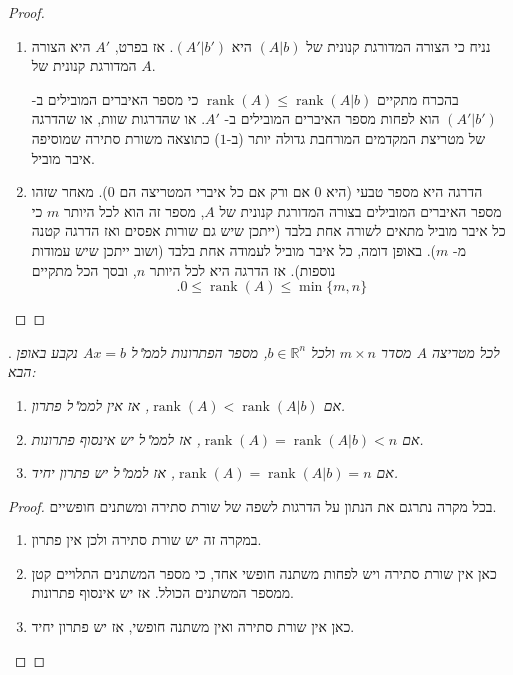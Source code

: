 \documentclass[
  hebrew,
  12pt,
  a4paper,
  oneside]{book}
\theoremstyle{definition}
\theoremstyle{remark}
\theoremstyle{plain}
\theoremstyle{remark}
\begin{document}
\begin{proof}
~

\begin{enumerate}
\def\labelenumi{\arabic{enumi}.}
\item
  נניח כי הצורה המדורגת קנונית של \((A|b)\) היא \((A'|b')\). אז בפרט,
  \(A'\) היא הצורה המדורגת קנונית של \(A\).

  בהכרח מתקיים
  \(\mathop{\mathrm{rank}}(A)\leq\mathop{\mathrm{rank}}(A|b)\) כי מספר
  האיברים המובילים ב- \((A'|b')\) הוא לפחות מספר האיברים המובילים ב-
  \(A'\). או שהדרגות שוות, או שהדרגה של מטריצת המקדמים המורחבת גדולה
  יותר (ב-\(1\)) כתוצאה משורת סתירה שמוסיפה איבר מוביל.
\item
  הדרגה היא מספר טבעי (היא \(0\) אם ורק אם כל איברי המטריצה הם \(0\)).
  מאחר שזהו מספר האיברים המובילים בצורה המדורגת קנונית של \(A\), מספר זה
  הוא לכל היותר \(m\) כי כל איבר מוביל מתאים לשורה אחת בלבד (ייתכן שיש
  גם שורות אפסים ואז הדרגה קטנה מ- \(m\)). באופן דומה, כל איבר מוביל
  לעמודה אחת בלבד (ושוב ייתכן שיש עמודות נוספות). אז הדרגה היא לכל היותר
  \(n\), ובסך הכל מתקיים
  \[.0\leq\mathop{\mathrm{rank}}(A)\leq\min\{m,n\}\]
\end{enumerate}

~◻
\end{proof}

\begin{proposition}

. \emph{\label{prop:rank-number} לכל מטריצה \(A\) מסדר \(m\times n\)
ולכל \(b\in\mathbb R^n\), מספר הפתרונות לממ"ל \(Ax=b\) נקבע באופן הבא:}

\begin{enumerate}
\def\labelenumi{\arabic{enumi}.}
\item
  \emph{אם \(\mathop{\mathrm{rank}}(A)<\mathop{\mathrm{rank}}(A|b)\), אז
  אין לממ"ל פתרון.}
\item
  \emph{אם \(\mathop{\mathrm{rank}}(A)=\mathop{\mathrm{rank}}(A|b)<n\),
  אז לממ"ל יש אינסוף פתרונות.}
\item
  \emph{אם \(\mathop{\mathrm{rank}}(A)=\mathop{\mathrm{rank}}(A|b)=n\),
  אז לממ"ל יש פתרון יחיד.}
\end{enumerate}

\end{proposition}

\begin{proof}
בכל מקרה נתרגם את הנתון על הדרגות לשפה של שורת סתירה ומשתנים חופשיים.

\begin{enumerate}
\def\labelenumi{\arabic{enumi}.}
\item
  במקרה זה יש שורת סתירה ולכן אין פתרון.
\item
  כאן אין שורת סתירה ויש לפחות משתנה חופשי אחד, כי מספר המשתנים התלויים
  קטן ממספר המשתנים הכולל. אז יש אינסוף פתרונות.
\item
  כאן אין שורת סתירה ואין משתנה חופשי, אז יש פתרון יחיד.
\end{enumerate}

~◻
\end{proof}
\end{document}
